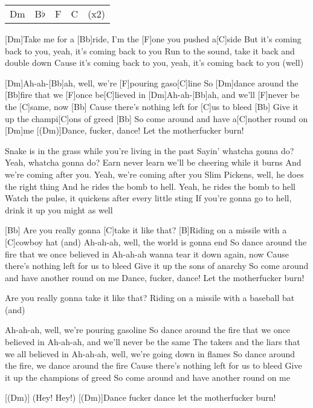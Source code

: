 

\begin{guitar}
	{\footnotesize\begin{tabular}{l|l|l|l l}
			Dm & B$\flat$ & F & C & (x2)
	\end{tabular}}
	
	[Dm]Take me for a [Bb]ride, I'm the [F]one you pushed a[C]side
	But it's coming back to you, yeah, it's coming back to you
	Run to the sound, take it back and double down
	Cause it's coming back to you, yeah, it's coming back to you (well)
	
	[Dm]Ah-ah-[Bb]ah, well, we're [F]pouring gaso[C]line
	So [Dm]dance around the [Bb]fire that we [F]once be[C]lieved in
	[Dm]Ah-ah-[Bb]ah, and we'll [F]never be the [C]same, now
	[Bb] Cause there's nothing left for [C]us to bleed
	[Bb] Give it up the champi[C]ons of greed
	[Bb] So come around and have a[C]nother round on [Dm]me
	[(Dm)]Dance, fucker, dance! Let the motherfucker burn!
	
	Snake is in the grass while you're living in the past
	Sayin' whatcha gonna do? Yeah, whatcha gonna do?
	Earn never learn we'll be cheering while it burns
	And we're coming after you. Yeah, we're coming after you
	Slim Pickens, well, he does the right thing
	And he rides the bomb to hell. Yeah, he rides the bomb to hell
	Watch the pulse, it quickens after every little sting
	If you're gonna go to hell, drink it up you might as well
	
	[Bb] Are you really gonna [C]take it like that?
	[B]Riding on a missile with a [C]cowboy hat (and)
	\pagebreak
	Ah-ah-ah, well, the world is gonna end
	So dance around the fire that we once believed in
	Ah-ah-ah wanna tear it down again, now
	Cause there's nothing left for us to bleed
	Give it up the sons of anarchy
	So come around and have another round on me
	Dance, fucker, dance! Let the motherfucker burn!
	
	
	Are you really gonna take it like that?
	Riding on a missile with a baseball bat (and)
	
	Ah-ah-ah, well, we're pouring gasoline
	So dance around the fire that we once believed in
	Ah-ah-ah, and we'll never be the same
	The takers and the liars that we all believed in
	Ah-ah-ah, well, we're going down in flames
	So dance around the fire, we dance around the fire
	Cause there's nothing left for us to bleed
	Give it up the champions of greed
	So come around and have another round on me
	
	[(Dm)] (Hey! Hey!)
	[(Dm)]Dance fucker dance let the motherfucker burn!
\end{guitar}